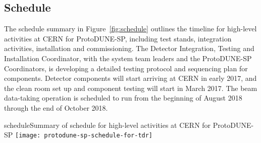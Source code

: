 \subsection{Schedule}

The schedule summary in Figure~\ref{fig:schedule} outlines the timeline for high-level activities at CERN for ProtoDUNE-SP, including test stands, integration activities, installation and commissioning.  The Detector Integration, Testing and Installation Coordinator, with the system team leaders and the ProtoDUNE-SP Coordinators, is developing a detailed testing protocol and sequencing plan for components.  Detector components will start arriving at CERN in early 2017, and the clean room set up and component testing will start in March 2017. The beam data-taking operation is scheduled to run from the beginning of August 2018 through the end of October 2018.

\begin{cdrfigure}{schedule}{Summary of schedule for high-level activities at CERN for ProtoDUNE-SP}
\texttt{[image: protodune-sp-schedule-for-tdr]}
\end{cdrfigure}